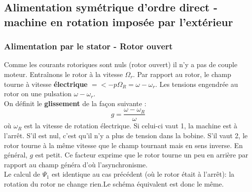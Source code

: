 		
	\subsection{Alimentation symétrique d'ordre direct - machine en rotation imposée 
	par l'extérieur}
		\subsubsection{Alimentation par le stator - Rotor ouvert}
		Comme les courants rotoriques sont nuls (rotor ouvert) il  n'y a pas de couple 
		moteur. Entraînons le rotor à la vitesse $\Omega_r$. Par rapport au rotor, le 
		champ tourne à vitesse \textbf{électrique} $= <-p\Omega_R = \omega-\omega_r$. 
		Les tensions engendrée au rotor on une pulsation $\omega-\omega_r$.\\		
		On définit le \textbf{glissement} de la façon suivante :
		\begin{equation}
		g = \dfrac{\omega-\omega_R}{\omega}
		\end{equation}
		où $\omega_R$ est la vitesse de rotation électrique. Si celui-ci vaut 1, 
		la machine est à l'arrêt. S'il est nul, c'est qu'il n'y a plus de tension 
		dans la bobine. S'il vaut 2, le rotor tourne à la même vitesse que le champ 
		tournant mais en sens inverse. En général, $g$ est petit. Ce facteur exprime 
		que le rotor tourne un peu en arrière par rapport au champ généra d’où 
		l'asynchronisme.\\
		
		Le calcul de $\Psi_1$ est identique au cas précédent (où le rotor était à 
		l'arrêt): la rotation du rotor ne change rien.Le schéma équivalent est donc 
		le même.\\

